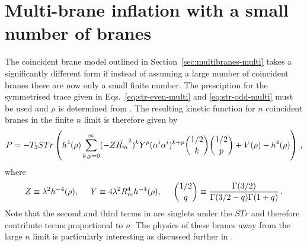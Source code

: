 \section{Multi-brane inflation with a small number of branes}
\label{sec:finiten-multi}
The coincident brane model outlined in Section~\ref{sec:multibranes-multi}
takes a significantly different form if instead of assuming a large number of
coincident branes there are now only a small finite number. The presciption for
the symmetrised trace given in Eqs.~\eqref{eq:str-even-multi} and
\eqref{eq:str-odd-multi} must be used and $\rho$ is determined from
. 
% 
The resulting kinetic function for $n$ coincident branes in 
the finite $n$ limit is therefore given by
% 
\begin{equation}
\label{eq:genP-multi}
P = -T_3 STr \left(h^4(\rho) \sum_{k,p=0}^{\infty}(-Z\dot{R_m}^2)^k Y^p (\alpha^i
\alpha^i)^{k+p}{1/2 \choose k} {1/2 \choose p} + V(\rho)-h^4(\rho) \right) \,,
\end{equation}
% 
where 
% 
\begin{equation}
Z \equiv \lambda^2 h^{-4}(\rho), \hspace{0.5cm} Y \equiv 4\lambda^2 R_m^4
h^{-4}(\rho),
\hspace{0.5cm} {1/2 \choose q}
\equiv \frac{\Gamma(3/2)}{\Gamma(3/2-q)\Gamma(1+q)} \,.
\end{equation}
% 
Note that the second and third terms in  
are singlets under the $STr$ and therefore contribute terms proportional 
to $n$. The physics of these branes away from the large $n$ limit is particularly interesting as
discussed further
in \cite{thomasward, Ward:2007gs}.


